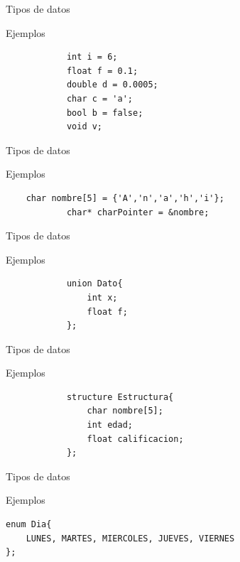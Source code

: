 \documentclass[handout, 14pt]{beamer}
\begin{document}
\begin{frame}[fragile]{Tipos de datos}
    \begin{exampleblock}{Ejemplos}
        \begin{verbatim}
            int i = 6;
            float f = 0.1;
            double d = 0.0005;
            char c = 'a';
            bool b = false;
            void v;
        \end{verbatim}
    \end{exampleblock}
\end{frame}

\begin{frame}[fragile]{Tipos de datos}
    \begin{exampleblock}{Ejemplos}
        \begin{verbatim}
    char nombre[5] = {'A','n','a','h','i'};
            char* charPointer = &nombre; 
        \end{verbatim}
    \end{exampleblock}
\end{frame}

\begin{frame}[fragile]{Tipos de datos}
    \begin{exampleblock}{Ejemplos}
        \begin{verbatim}
            union Dato{
                int x;
                float f;
            };
        \end{verbatim}
    \end{exampleblock}
\end{frame}

\begin{frame}[fragile]{Tipos de datos}
    \begin{exampleblock}{Ejemplos}
        \begin{verbatim}
            structure Estructura{
                char nombre[5];
                int edad;
                float calificacion;
            };
        \end{verbatim}
    \end{exampleblock}
\end{frame}

\begin{frame}[fragile]{Tipos de datos}
    \begin{exampleblock}{Ejemplos}
        \begin{verbatim}
enum Dia{
    LUNES, MARTES, MIERCOLES, JUEVES, VIERNES
};
        \end{verbatim}
    \end{exampleblock}
\end{frame}
\end{document}
